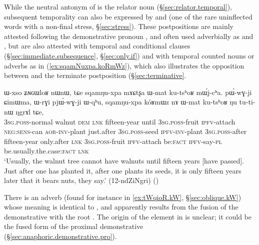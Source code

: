 While the neutral antonym of  is the relator noun  (§\ref{sec:relator.temporal}), subsequent temporality can also be expressed by  and  (one of the rare uninflected words with a non-final stress, §\ref{sec:stress}). These postpositions are mainly attested following the demonstrative pronoun , and often used adverbially as  and , but are also attested with temporal and conditional clauses (§\ref{sec:immediate.subsequence}, §\ref{sec:only.if}) and with temporal counted nouns or adverbs as in (\ref{ex:sqamNuxpa.koRmWz}), which also illustrates the opposition between  and the terminate postposition  (§\ref{sec:terminative}. 

\begin{exe}
\ex \label{ex:sqamNuxpa.koRmWz}
\gll ɯ-xso ʑɴɢɯloʁ nɯnɯ, tɕe sqamŋu-xpa mɤɕtʂa ɯ-mat ku-tsʰoʁ mɯ́j-cʰa. pɯ́-wɣ-ji ɕimɯma, ɯ-rɣi pjɯ́-wɣ-ji ɯ-qʰu,  sqamŋu-xpa kóʁmɯz nɤ ɯ-mat ku-tsʰoʁ ŋu tu-ti-nɯ ŋgrɤl tɕe,  \\
\textsc{3sg}.\textsc{poss}-normal walnut  \textsc{dem} \textsc{lnk} fifteen-year until \textsc{3sg}.\textsc{poss}-fruit \textsc{ipfv}-attach \textsc{neg}:\textsc{sens}-can \textsc{aor}-\textsc{inv}-plant just.after \textsc{3sg}.\textsc{poss}-seed \textsc{ipfv}-\textsc{inv}-plant \textsc{3sg}.\textsc{poss}-after fifteen-year only.after \textsc{lnk} \textsc{3sg}.\textsc{poss}-fruit \textsc{ipfv}-attach be:\textsc{fact} \textsc{ipfv}-say-\textsc{pl} be.usually.the.case:\textsc{fact} \textsc{lnk} \\
\glt `Usually, the walnut tree cannot have walnuts until fifteen years [have passed]. Just after one has planted it, after one plants its seeds, it is only fifteen years later that it bears nuts, they say.' (12-ndZiNgri)
()
\end{exe}

There is an adverb  (found for instance in \ref{ex:tWqioR.kW}, §\ref{sec:oblique.kW}) whose meaning is identical to , and apparently results from the fusion of the demonstrative  with the root . The origin of the  element in  is unclear; it could be the fused form of the proximal demonstrative  (§\ref{sec:anaphoric.demonstrative.pro}).


